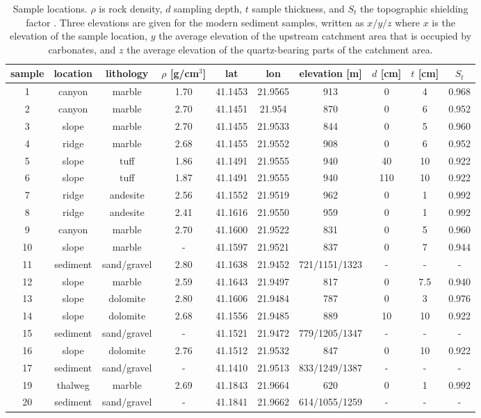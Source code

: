 \documentclass[titlepage]{article}
\begin{document}
\begin{table}[!ht]
  \centering
  \begin{tabular}{cccccccccc}
    \hline
    sample & location & lithology & $\rho$ [g/cm$^{3}$] & lat &
    lon & elevation [m] & $d$ [cm] & $t$ [cm] & $S_t$ \\ \hline
    1 & canyon & marble & 1.70 & 41.1453 & 21.9565 & 913 & 0 & 4 & 0.968 \\
    2 & canyon & marble & 2.70 & 41.1451 & 21.954 & 870 & 0 & 6 & 0.952 \\
    3 & slope & marble & 2.70 & 41.1455 & 21.9533 & 844 & 0 & 5 & 0.960 \\
    4 & ridge & marble & 2.68 & 41.1455 & 21.9552 & 908 & 0 & 6 & 0.952 \\
    5 & slope & tuff & 1.86 & 41.1491 & 21.9555 & 940 & 40 & 10 & 0.922 \\
    6 & slope & tuff & 1.87 & 41.1491 & 21.9555 & 940 & 110 & 10 & 0.922 \\
    7 & ridge & andesite & 2.56 & 41.1552 & 21.9519 & 962 & 0 & 1 & 0.992 \\
    8 & ridge & andesite & 2.41 & 41.1616 & 21.9550 & 959 & 0 & 1 & 0.992 \\
    9 & canyon & marble & 2.70 & 41.1600 & 21.9522 & 831 & 0 & 5 & 0.960 \\
    10 & slope & marble & - & 41.1597 & 21.9521 & 837 & 0 & 7 & 0.944 \\
    11 & sediment & sand/gravel & 2.80 & 41.1638 & 21.9452 & 721/1151/1323 & - & - & - \\
    12 & slope & marble & 2.59 & 41.1643 & 21.9497 & 817 & 0 & 7.5 & 0.940 \\
    13 & slope & dolomite & 2.80 & 41.1606 & 21.9484 & 787 & 0 & 3 & 0.976 \\
    14 & slope & dolomite & 2.68 & 41.1556 & 21.9485 & 889 & 10 & 10 & 0.922 \\
    15 & sediment & sand/gravel & - & 41.1521 & 21.9472 & 779/1205/1347 & - & - & - \\
    16 & slope & dolomite & 2.76 & 41.1512 & 21.9532 & 847 & 0 & 10 & 0.922 \\
    17 & sediment & sand/gravel & - & 41.1410 & 21.9513 & 833/1249/1387 & - & - & - \\
    19 & thalweg & marble & 2.69 & 41.1843 & 21.9664 & 620 & 0 & 1 & 0.992 \\
    20 & sediment & sand/gravel & - & 41.1841 & 21.9662 & 614/1055/1259 & - & - & - \\ \hline
  \end{tabular}
  \caption{Sample locations. $\rho$ is rock density, $d$ sampling
    depth, $t$ sample thickness, and $S_t$ the topographic shielding
    factor \citep{vermeesch2007c}. Three elevations are given for the
    modern sediment samples, written as $x/y/z$ where $x$ is the
    elevation of the sample location, $y$ the average elevation of the
    upstream catchment area that is occupied by carbonates, and $z$
    the average elevation of the quartz-bearing parts of the catchment
    area.}
  \label{tab:samplelocations}
\end{table}
\end{document}
